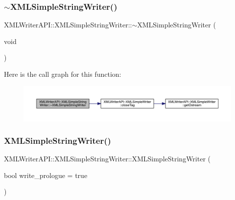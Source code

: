 \subsubsection{\texorpdfstring{$\sim$XMLSimpleStringWriter()}{~XMLSimpleStringWriter()}\hspace{0.1cm}{\footnotesize\ttfamily [2/3]}}
{\footnotesize\ttfamily X\+M\+L\+Writer\+A\+P\+I\+::\+X\+M\+L\+Simple\+String\+Writer\+::$\sim$\+X\+M\+L\+Simple\+String\+Writer (\begin{DoxyParamCaption}\item[{void}]{ }\end{DoxyParamCaption})\hspace{0.3cm}{\ttfamily [inline]}}

Here is the call graph for this function\+:
\nopagebreak
\begin{figure}[H]
\begin{center}
\leavevmode
\includegraphics[width=350pt]{da/dec/classXMLWriterAPI_1_1XMLSimpleStringWriter_a10b08cc22793241a637eefa425e0ebe5_cgraph}
\end{center}
\end{figure}
\mbox{\label{classXMLWriterAPI_1_1XMLSimpleStringWriter_a7caa663dd64c87fa0eabc563154143a5}} 
\subsubsection{\texorpdfstring{XMLSimpleStringWriter()}{XMLSimpleStringWriter()}\hspace{0.1cm}{\footnotesize\ttfamily [3/3]}}
{\footnotesize\ttfamily X\+M\+L\+Writer\+A\+P\+I\+::\+X\+M\+L\+Simple\+String\+Writer\+::\+X\+M\+L\+Simple\+String\+Writer (\begin{DoxyParamCaption}\item[{bool}]{write\+\_\+prologue = {\ttfamily true} }\end{DoxyParamCaption})\hspace{0.3cm}{\ttfamily [inline]}}

